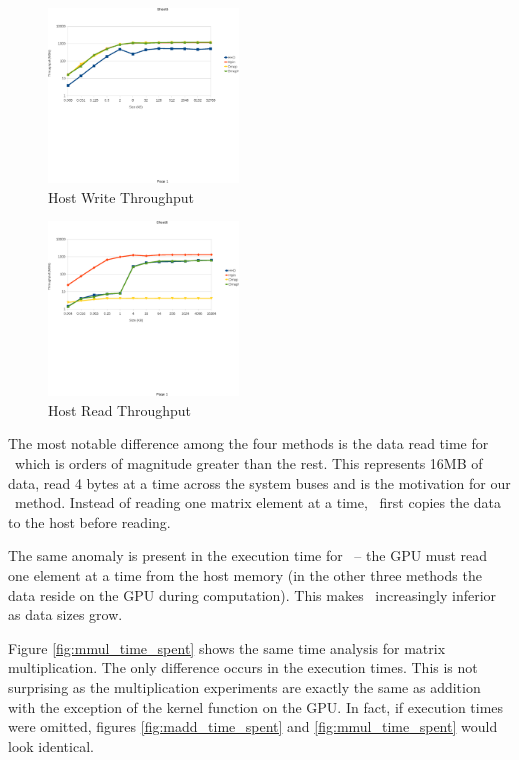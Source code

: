 \begin{figure}[t]
\centering
\includegraphics[width=0.45\textwidth, trim=0.0in 2.75in -0.1in 0.60in, clip=true]{eps/write_tput.eps}
\caption{Host Write Throughput}
\label{fig:write_tput}
\end{figure}
\begin{figure}[tb]
\centering
\includegraphics[width=0.45\textwidth, trim=0.0in 2.5in -0.1in 0.6in, clip=true]{eps/read_tput.eps}
\caption{Host Read Throughput}
\label{fig:read_tput}
\end{figure}

The most notable difference among the four methods is the data read time for \dm\ which is orders of magnitude greater than the rest. This represents 16MB of data, read 4 bytes at a time across the system buses and is the motivation for our \dmh\ method. Instead of reading one matrix element at a time, \dmh\ first copies the data to the host before reading.

The same anomaly is present in the execution time for \hp\ -- the GPU must read one element at a time from the host memory (in the other three methods the data reside on the GPU during computation). This makes \hp\ increasingly inferior as data sizes grow.

Figure \ref{fig:mmul_time_spent} shows the same time analysis for matrix multiplication. The only difference occurs in the execution times. This is not surprising as the multiplication experiments are exactly the same as addition with the exception of the kernel function on the GPU. In fact, if execution times were omitted, figures \ref{fig:madd_time_spent} and \ref{fig:mmul_time_spent} would look identical.

